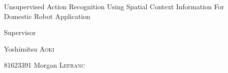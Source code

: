 \begin{center}
\vspace*{20pt}

\vspace{100pt}

\vspace{10pt}

\Large{Unsupervised Action Recognition Using Spatial Context Information For Domestic Robot Application}
\vspace{180pt}

\vspace{40pt}

\large {Supervisor}

\large {Yoshimitsu \textsc{Aoki}}

\vspace{30pt}

\large {81623391}
\large {Morgan \textsc{Lefranc}}

\end{center}
